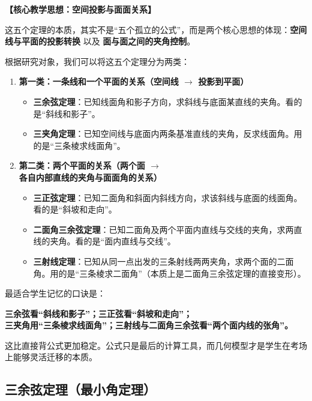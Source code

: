 \documentclass[11pt,a4paper]{ctexart}
\begin{document}
\noindent\textbf{【核心教学思想：空间投影与面面关系】}\par
这五个定理的本质，其实不是“五个孤立的公式”，而是两个核心思想的体现：\textbf{空间线与平面的投影转换} 以及 \textbf{面与面之间的夹角控制}。

根据研究对象，我们可以将这五个定理分为两类：
\begin{enumerate}
    \item \textbf{第一类：一条线和一个平面的关系（空间线 $\longrightarrow$ 投影到平面）}
    \begin{itemize}
        \item \textbf{三余弦定理}：已知线面角和影子方向，求斜线与底面某直线的夹角。看的是“斜线和影子”。
        \item \textbf{三夹角定理}：已知空间线与底面内两条基准直线的夹角，反求线面角。用的是“三条棱求线面角”。
    \end{itemize}
    \item \textbf{第二类：两个平面的关系（两个面 $\longrightarrow$ 各自内部直线的夹角与面面角的关系）}
    \begin{itemize}
        \item \textbf{三正弦定理}：已知二面角和斜面内斜线方向，求该斜线与底面的线面角。看的是“斜坡和走向”。
        \item \textbf{二面角三余弦定理}：已知二面角及两个平面内直线与交线的夹角，求两直线的夹角。看的是“面内直线与交线”。
        \item \textbf{三射线定理}：已知从同一点出发的三条射线两两夹角，求两个面的二面角。用的是“三条棱求二面角”（本质上是二面角三余弦定理的直接变形）。
    \end{itemize}
\end{enumerate}

最适合学生记忆的口诀是：
\begin{center}
\textbf{三余弦看“斜线和影子”；三正弦看“斜坡和走向”；\\
三夹角用“三条棱求线面角”；三射线与二面角三余弦看“两个面内线的张角”。}
\end{center}
这比直接背公式更加稳定。公式只是最后的计算工具，而几何模型才是学生在考场上能够灵活迁移的本质。


\subsection{三余弦定理（最小角定理）}
\end{document}
